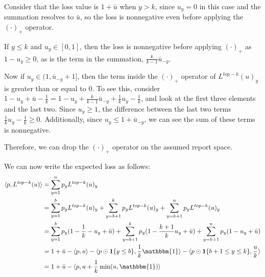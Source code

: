 \documentclass[12pt]{article}
\newcommand{\ubar}{\bar{u}}
\newcommand{\inprod}[2]{\langle #1, #2 \rangle}%
\newcommand{\ones}{\mathbbm{1}}
\newcommand{\Ind}[1]{\mathbf{1}\{#1\}}
\begin{document}
Consider that the loss value is $1 + \bar u$ when $y > k$, since $u_y = 0$ in this case and the summation resolves to $\bar u$, so the loss is nonnegative even before applying the $(\cdot)_+$ operator.

If $y \leq k$ and $u_y \in [0,1]$, then the loss is nonnegative before applying $(\cdot)_+$ as $1-u_y \geq 0$, as is the term in the summation, $\frac k {k-1} \bar u_{-y}$.

Now if $u_y \in (1, \bar u_{-y} + 1]$, then the term inside the $(\cdot)_+$ operator of $L^{top-k}(u)_y$ is greater than or equal to $0$.
To see this, consider $1 - u_y + \bar u - \frac 1 k = 1 - u_y + \frac k {k-1} \bar u_{-y} + \frac 1 k u_y - \frac 1 k$, and look at the first three elements and the last two.
Since $u_y \geq 1$, the difference between the last two terms $\frac 1 k u_y - \frac 1 k \geq 0$.
Additionally, since $u_y \leq 1 +  \ubar_{-y}$, we can see the sum of these terms is nonnegative.

Therefore, we can drop the $(\cdot)_+$ operator on the assumed report space.

We can now write the expected loss as follows:
\begin{align*}
\inprod{p}{L^{top-k}(u)} &= \sum_{y=1}^n p_y L^{top-k}(u)_y \\
&= \sum_{y=1}^b p_y L^{top-k}(u)_y + \sum_{y=b+1}^k p_y L^{top-k}(u)_y + \sum_{y=k+1}^n p_y L^{top-k}(u)_y\\
&= \sum_{y=1}^b p_y (1 - \frac 1 k - u_y + \ubar) + \sum_{y=b+1}^k p_y (1 - \frac{k+1} k u_y + \ubar) + \sum_{y=k+1}^n p_y(1 - u_y + \ubar)\\
&= 1 + \ubar - \inprod{p}{u} - \inprod{p \odot \Ind{y \leq b}}{\frac 1 k \ones} - \inprod{p \odot \Ind{b+1 \leq y \leq k}}{ \frac u k}\\
&= 1 + \ubar - \inprod{p}{u + \frac 1 k \min(u, \ones)}
\end{align*}
\end{document}
